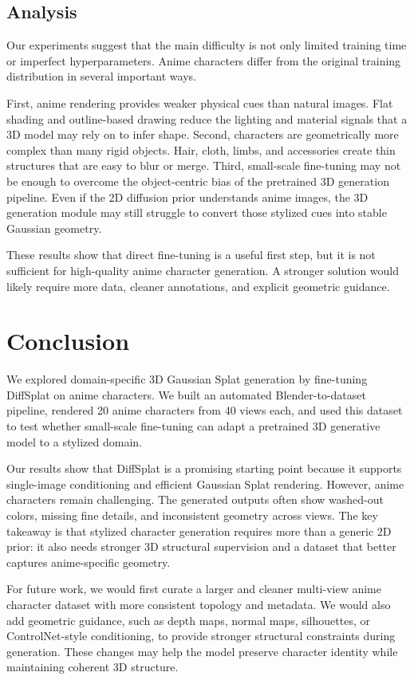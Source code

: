 \documentclass[10pt,twocolumn,letterpaper]{article}
\begin{document}
\subsection{Analysis}

Our experiments suggest that the main difficulty is not only limited training time or imperfect hyperparameters. Anime characters differ from the original training distribution in several important ways.

First, anime rendering provides weaker physical cues than natural images. Flat shading and outline-based drawing reduce the lighting and material signals that a 3D model may rely on to infer shape. Second, characters are geometrically more complex than many rigid objects. Hair, cloth, limbs, and accessories create thin structures that are easy to blur or merge. Third, small-scale fine-tuning may not be enough to overcome the object-centric bias of the pretrained 3D generation pipeline. Even if the 2D diffusion prior understands anime images, the 3D generation module may still struggle to convert those stylized cues into stable Gaussian geometry.

These results show that direct fine-tuning is a useful first step, but it is not sufficient for high-quality anime character generation. A stronger solution would likely require more data, cleaner annotations, and explicit geometric guidance.

\section{Conclusion}

We explored domain-specific 3D Gaussian Splat generation by fine-tuning DiffSplat on anime characters. We built an automated Blender-to-dataset pipeline, rendered 20 anime characters from 40 views each, and used this dataset to test whether small-scale fine-tuning can adapt a pretrained 3D generative model to a stylized domain.

Our results show that DiffSplat is a promising starting point because it supports single-image conditioning and efficient Gaussian Splat rendering. However, anime characters remain challenging. The generated outputs often show washed-out colors, missing fine details, and inconsistent geometry across views. The key takeaway is that stylized character generation requires more than a generic 2D prior: it also needs stronger 3D structural supervision and a dataset that better captures anime-specific geometry.

For future work, we would first curate a larger and cleaner multi-view anime character dataset with more consistent topology and metadata. We would also add geometric guidance, such as depth maps, normal maps, silhouettes, or ControlNet-style conditioning, to provide stronger structural constraints during generation. These changes may help the model preserve character identity while maintaining coherent 3D structure.

{
\small


}
\end{document}
